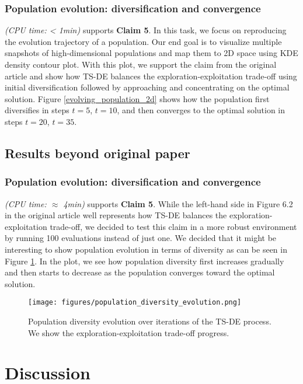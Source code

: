 \subsubsection{Population evolution: diversification and convergence}
\textit{(CPU time: < 1min)} supports \textbf{Claim 5}.
In this task, we focus on reproducing the evolution trajectory of a population. Our end goal is to visualize multiple snapshots of high-dimensional populations and map them to 2D space using KDE density contour plot. With this plot, we support the claim from the original article and show how TS-DE balances the exploration-exploitation trade-off using initial diversification followed by approaching and concentrating on the optimal solution. Figure \ref{evolving_population_2d} shows how the population first diversifies in steps $t=5$, $t=10$, and then converges to the optimal solution in steps $t=20$, $t=35$.


\subsection{Results beyond original paper} 
\subsubsection{Population evolution: diversification and convergence} \textit{(CPU time: $\approx$ 4min)} supports \textbf{Claim 5}. While the left-hand side in Figure 6.2 in the original article well represents how TS-DE balances the exploration-exploitation trade-off, we decided to test this claim in a more robust environment by running 100 evaluations instead of just one. We decided that it might be interesting to show population evolution in terms of diversity as can be seen in Figure \ref{population_diversity}. In the plot, we see how population diversity first increases gradually and then starts to decrease as the population converges toward the optimal solution.

\begin{figure}[h]
    \centering
    \texttt{[image: figures/population\_diversity\_evolution.png]}
    \caption{Population diversity evolution over iterations of the TS-DE process. We show the exploration-exploitation trade-off progress.}
    \label{population_diversity}
\end{figure}

\section{Discussion}

